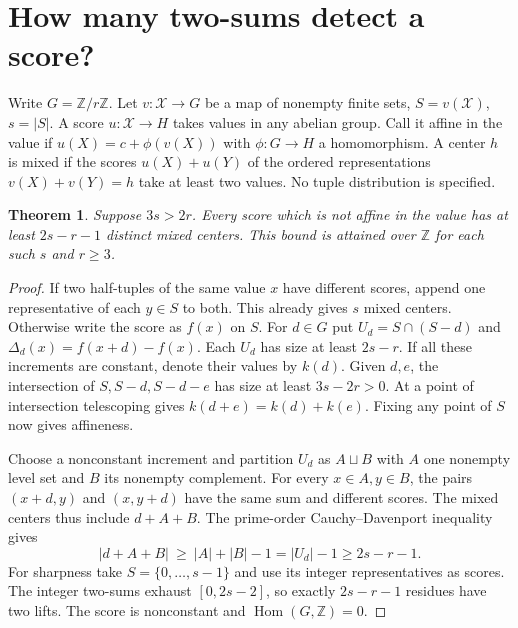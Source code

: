 \documentclass[11pt]{article}
\newtheorem{theorem}{Theorem}
\newcommand{\Z}{\mathbb Z}
\begin{document}
\section{How many two-sums detect a score?}
Write $G=\Z/r\Z$. Let $v:\mathcal X\to G$ be a map of nonempty finite sets, $S=v(\mathcal X)$, $s=|S|$. A score $u:\mathcal X\to H$ takes values in any abelian group. Call it affine in the value if $u(X)=c+\phi(v(X))$ with $\phi:G\to H$ a homomorphism. A center $h$ is mixed if the scores $u(X)+u(Y)$ of the ordered representations $v(X)+v(Y)=h$ take at least two values. No tuple distribution is specified.

\begin{theorem}\label{th:mixed}
Suppose $3s>2r$. Every score which is not affine in the value has at least $2s-r-1$ distinct mixed centers. This bound is attained over $\Z$ for each such $s$ and $r\ge 3$.
\end{theorem}
\begin{proof}
If two half-tuples of the same value $x$ have different scores, append one representative of each $y\in S$ to both. This already gives $s$ mixed centers. Otherwise write the score as $f(x)$ on $S$. For $d\in G$ put $U_d=S\cap(S-d)$ and $\Delta_d(x)=f(x+d)-f(x)$. Each $U_d$ has size at least $2s-r$. If all these increments are constant, denote their values by $k(d)$. Given $d,e$, the intersection of $S,S-d,S-d-e$ has size at least $3s-2r>0$. At a point of intersection telescoping gives $k(d+e)=k(d)+k(e)$. Fixing any point of $S$ now gives affineness.

Choose a nonconstant increment and partition $U_d$ as $A\sqcup B$ with $A$ one nonempty level set and $B$ its nonempty complement. For every $x\in A,y\in B$, the pairs $(x+d,y)$ and $(x,y+d)$ have the same sum and different scores. The mixed centers thus include $d+A+B$. The prime-order Cauchy--Davenport inequality gives
\[
|d+A+B|\ \ge\ |A|+|B|-1=|U_d|-1\ge 2s-r-1.
\]
For sharpness take $S=\{0,\ldots,s-1\}$ and use its integer representatives as scores. The integer two-sums exhaust $[0,2s-2]$, so exactly $2s-r-1$ residues have two lifts. The score is nonconstant and $\operatorname{Hom}(G,\Z)=0$.
\end{proof}
\end{document}
